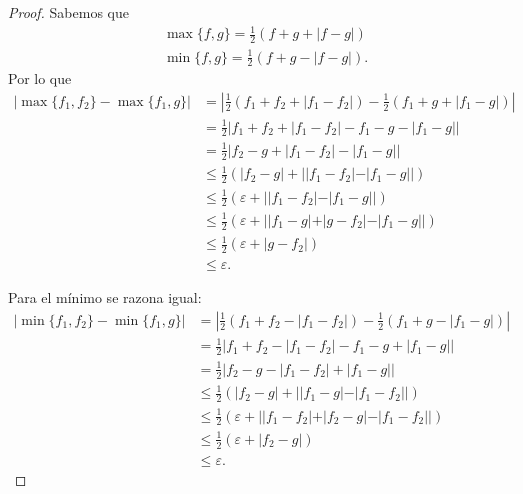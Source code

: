 \begin{proof}
    Sabemos que 
    \begin{align}
        & \max\{f,g\} = \frac{1}{2} (f+g+ |f-g|) \\
        & \min \{f,g\} = \frac{1}{2} (f+g -|f-g|).
    \end{align}
    Por lo que 
    \begin{align}
        |
            \max\{f_1, f_2\}
            -
            \max\{f_1, g\}
        |   
        & = 
        \left|
            \frac{1}{2} (f_1+f_2+ |f_1-f_2|)
            -
            \frac{1}{2} (f_1+g+ |f_1-g|)
        \right|
        \\
        &= 
        \frac{1}{2}
        \left|
             f_1+f_2+ |f_1-f_2|
            -
            f_1 - g - |f_1-g|
        \right|
        \\
        &= 
        \frac{1}{2}
        \left|
             f_2 - g + |f_1-f_2|
           - |f_1-g|
        \right|
        \\
        & \leq
        \frac{1}{2}
        (|f_2 - g |
         +
        | |f_1-f_2|- |f_1-g||
        )
        \\
        & \leq
        \frac{1}{2}
        (\varepsilon
         +
        | |f_1-f_2|- |f_1-g||
        )
        \\
        & \leq
        \frac{1}{2}
        (\varepsilon
         +
        | |f_1 - g| + |g -f_2|- |f_1-g||
        )
        \\
        & \leq
        \frac{1}{2}
        (\varepsilon
         +
        |g -f_2|
        )
        \\
        & \leq
        \varepsilon.
    \end{align} 

    Para el mínimo se razona igual: 
    \begin{align}
        |
            \min\{f_1, f_2\}
            -
            \min\{f_1, g\}
        |   
        & = 
        \left|
            \frac{1}{2} (f_1+f_2- |f_1-f_2|)
            -
            \frac{1}{2} (f_1+g - |f_1-g|)
        \right|
        \\
        &= 
        \frac{1}{2}
        \left|
             f_1+f_2- |f_1-f_2|
            -
            f_1 - g + |f_1-g|
        \right|
        \\
        &= 
        \frac{1}{2}
        \left|
             f_2 - g - |f_1-f_2|
           + |f_1-g|
        \right|
        \\
        & \leq
        \frac{1}{2}
        (|f_2 - g |
         +
        | |f_1-g| - |f_1-f_2||
        )
        \\
        & \leq
        \frac{1}{2}
        (\varepsilon
         +
        | |f_1 - f_2| + |f_2 - g|- |f_1- f_2||
        )
        \\
        & \leq
        \frac{1}{2}
        (\varepsilon
         +
        |f_2 - g|
        )
        \\
        & \leq
        \varepsilon.
    \end{align} 
    
\end{proof}

